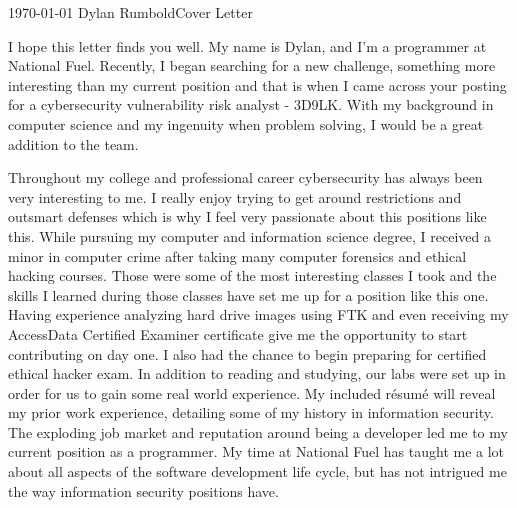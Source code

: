 \documentclass[11pt, letterpaper]{awesome-cv}
\begin{document}
\makecvheader[R]

\makecvfooter
  {\today}%
  {Dylan Rumbold{\enskip\cdotp\enskip}Cover Letter}
  {}

\makelettertitle
  {}

\begin{cvletter}

I hope this letter finds you well. My name is Dylan, and I'm a programmer at National Fuel. Recently, I began searching for a new challenge, something more interesting than my current position and that is when I came across your posting for a cybersecurity vulnerability risk analyst - 3D9LK. With my background in computer science and my ingenuity when problem solving, I would be a great addition to the team.

Throughout my college and professional career cybersecurity has always been very interesting to me. I really enjoy trying to get around restrictions and outsmart defenses which is why I feel very passionate about this positions like this. While pursuing my computer and information science degree, I received a minor in computer crime after taking many computer forensics and ethical hacking courses. Those were some of the most interesting classes I took and the skills I learned during those classes have set me up for a position like this one. Having experience analyzing hard drive images using FTK and even receiving my AccessData Certified Examiner certificate give me the opportunity to start contributing on day one. I also had the chance to begin preparing for certified ethical hacker exam. In addition to reading and studying, our labs were set up in order for us to gain some real world experience. My included résumé will reveal my prior work experience, detailing some of my history in information security. The exploding job market and reputation around being a developer led me to my current position as a programmer. My time at National Fuel has taught me a lot about all aspects of the software development life cycle, but has not intrigued me the way information security positions have.


\end{cvletter}
\end{document}
